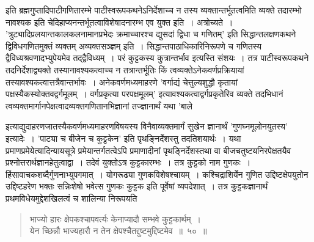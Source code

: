 \documentclass[11pt, openany]{book}
\begin{document}
{{ इति ब्रह्मगुप्तादिपाटीगणितारम्भे पाटीस्वरूपकथनेऽनिर्देशाच्च न तस्य
व्यक्तान्तर्भूतत्वमिति व्यक्ते तदारम्भो नावश्यक इति चेदिहाप्यनन्तर्भूतत्वाविशेषादनारम्भ एव युक्त इति~। अत्रोच्यते~। {\qt 'त्रुट्यादिप्रलयान्तकालकलनामानप्रभेदः
क्रमाच्चारश्च द्युसदां द्विधा च गणितम्'} इति सिद्धान्तलक्षणकथने द्विविधगणितमुक्तं
व्यक्तम् अव्यक्तसञ्ज्ञम् इति~। सिद्धान्तपाठाधिकारिनिरूपणे च गणितस्य
द्वैविध्यश्रवणादभ्युपेयमेव तद्द्वैविध्यम्~। 
परं कुट्टकस्य कुत्रान्तर्भाव इत्यस्ति संशयः~। तत्र पाटीस्वरूपकथने
तदनिर्देशाद्व्यक्ते तस्यानावश्यकत्वाच्च न तत्रान्तर्भूतिः किं
त्वव्यक्तेऽनेकवर्णप्रक्रियायां
तस्यावश्यकत्वात्तत्रैवान्तर्भावः~। अनेकवर्णमध्यमाहरणे {\qt 'वर्गाद्यं चेत्तुल्यशुद्धौ कृतायां पक्षस्यैकस्योक्तवद्वर्गमूलम्~। वर्गप्रकृत्या परपक्षमूलम्'} इत्यावश्यकत्वाद्वर्गप्रकृतेरिव व्यक्ते 
तदभिधानं त्वव्यक्तमार्गानपेक्षत्वादव्यक्तगणितानभिज्ञानां तज्ज्ञानार्थं
यथा {\qt 'बाले}
\thispagestyle{empty}
\afterpage{\fancyhead[LE,RO]{\thepage}}
\cfoot{}
\newpage

 इत्याद्युदाहरणजातस्यैकवर्णमध्यमाहरणविषयस्य
विनैवाव्यक्तमार्गं सुखेन ज्ञानार्थं {\qt 'गुणघ्नमूलोनयुतस्य'} इत्यादेः~। {\qt 'पाट्या च बीजेन च कुट्टकेन'} इति पृथङ्निर्देशस्तु तदतिशयार्थः~। यथा प्रमाणप्रमेयेत्यादिन्यायसूत्रे प्रमेयान्तर्गतत्वेऽपि प्रमाणादीनां पृथङ्निर्देशस्तथा
वा बीजचतुष्टयनिरपेक्षतयैव प्रश्नोत्तरार्थज्ञानहेतुत्वाद्वा~। तदेवं
युक्तोऽत्र कुट्टकारम्भः~। तत्र कुट्टको नाम गुणकः~।
हिंसावाचकशब्दैर्गुणनाभ्युपगमात्~। योगरूढ्या गुणकविशेषश्चायम्~।
कश्चिद्राशिर्येन गुणित उद्दिष्टक्षेपयुतोन उद्दिष्टहरेण भक्तः सन्निःशेषो
भवेत्स गुणकः कुट्टक इति पूर्वेषां व्यपदेशात्~। तत्र कुट्टकज्ञानार्थं
प्रथमविधेयमुद्देशखिलत्वं च शालिन्या निरूपयति\textendash 

 \label{50}
\begin{quote}
    \ab 
    भाज्यो हारः क्षेपकश्चापवर्त्यः केनाप्यादौ सम्भवे कुट्टकार्थम्~। \\
येन च्छिन्नौ भाज्यहारौ न तेन क्षेपश्चैतद्दुष्टमुद्दिष्टमेव~॥~५०~॥
\end{quote}

}}
\end{document}
